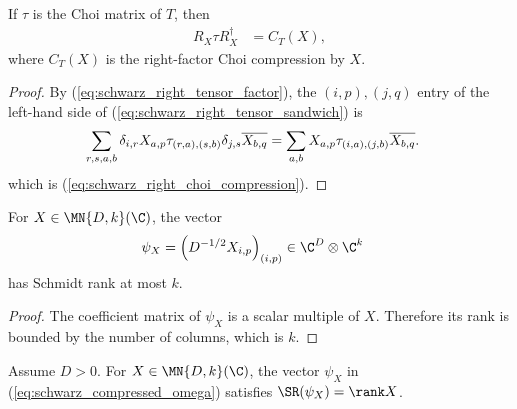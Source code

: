 \begin{theorem}
    \label{thm:choi_right_tensor_sandwich}
    \leanok
    If $\tau$ is the Choi matrix of $T$, then
    \begin{align}
        R_X\tau R_X^\dagger
         & =C_T(X),
        \label{eq:schwarz_right_tensor_sandwich}
    \end{align}
    where $C_T(X)$ is the right-factor Choi compression by $X$.
\end{theorem}

\begin{proof}
    \leanok
    By (\ref{eq:schwarz_right_tensor_factor}), the $(i,p),(j,q)$ entry of the
    left-hand side of (\ref{eq:schwarz_right_tensor_sandwich}) is
    \begin{align}
        \sum_{r,s,a,b}
        \delta_{i,r}X_{a,p}\tau_{(r,a),(s,b)}
        \delta_{j,s}\overline{X_{b,q}}
         & =\sum_{a,b}X_{a,p}\tau_{(i,a),(j,b)}
        \overline{X_{b,q}}.
        \notag
    \end{align}
    which is (\ref{eq:schwarz_right_choi_compression}).
\end{proof}

\begin{lemma}
    \label{lem:compressed_omega_schmidt_rank}
    \leanok
    For $X\in\MN{D,k}(\C)$, the vector
    \begin{align}
        \psi_X
         & =\left(D^{-1/2}X_{i,p}\right)_{(i,p)}
        \in\C^D\otimes\C^k
        \label{eq:schwarz_compressed_omega}
    \end{align}
    has Schmidt rank at most $k$.
\end{lemma}

\begin{proof}
    \leanok
    The coefficient matrix of $\psi_X$ is a scalar multiple of $X$. Therefore
    its rank is bounded by the number of columns, which is $k$.
\end{proof}

\begin{theorem}
    \label{thm:compressed_omega_schmidt_rank_eq_rank}
    \leanok
    Assume $D>0$. For $X\in\MN{D,k}(\C)$, the vector $\psi_X$ in
    (\ref{eq:schwarz_compressed_omega}) satisfies
    $\SR(\psi_X)=\rank X$.
\end{theorem}

